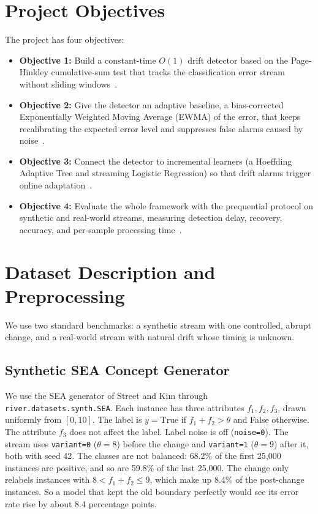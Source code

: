 \documentclass[conference]{IEEEtran}
\begin{document}
\section{Project Objectives}
The project has four objectives:
\begin{itemize}
    \item \textbf{Objective 1:} Build a constant-time $O(1)$ drift detector based on the Page-Hinkley cumulative-sum test that tracks the classification error stream without sliding windows~\cite{parasteh2024}.
    \item \textbf{Objective 2:} Give the detector an adaptive baseline, a bias-corrected Exponentially Weighted Moving Average (EWMA) of the error, that keeps recalibrating the expected error level and suppresses false alarms caused by noise~\cite{rum2026}.
    \item \textbf{Objective 3:} Connect the detector to incremental learners (a Hoeffding Adaptive Tree and streaming Logistic Regression) so that drift alarms trigger online adaptation~\cite{cano2026}.
    \item \textbf{Objective 4:} Evaluate the whole framework with the prequential protocol on synthetic and real-world streams, measuring detection delay, recovery, accuracy, and per-sample processing time~\cite{parasteh2024, rum2026}.
\end{itemize}

\section{Dataset Description and Preprocessing}
We use two standard benchmarks: a synthetic stream with one controlled, abrupt change, and a real-world stream with natural drift whose timing is unknown.

\subsection{Synthetic SEA Concept Generator}
We use the SEA generator of Street and Kim through \texttt{river.datasets.synth.SEA}.
Each instance has three attributes $f_1, f_2, f_3$, drawn uniformly from $[0, 10]$.
The label is $y = \text{True}$ if $f_1 + f_2 > \theta$ and False otherwise. The attribute $f_3$ does not affect the label.
Label noise is off (\texttt{noise=0}).
The stream uses \texttt{variant=0} ($\theta = 8$) before the change and \texttt{variant=1} ($\theta = 9$) after it, both with seed 42.
The classes are not balanced: 68.2\% of the first 25{,}000 instances are positive, and so are 59.8\% of the last 25{,}000.
The change only relabels instances with $8 < f_1 + f_2 \le 9$, which make up 8.4\% of the post-change instances.
So a model that kept the old boundary perfectly would see its error rate rise by about 8.4 percentage points.
\end{document}
